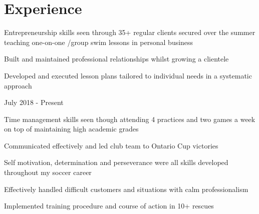 \documentclass[letterpaper]{deedy-resume} %
\begin{document}
\begin{minipage}[t]{0.66\textwidth}
\sectionspace




\section{Experience}


\begin{tightitemize}
\item Entrepreneurship skills seen through 35+ regular clients secured over the summer
teaching one-on-one /group swim lessons in personal business 
\item Built and maintained professional relationships whilst growing a clientele
\item Developed and executed lesson plans tailored to individual needs in a systematic approach 

\end{tightitemize}

\sectionspace %


July 2018 - Present 

\begin{tightitemize}

\item Time management skills seen though attending 4 practices and two games a week on top of maintaining high academic grades 
\item Communicated effectively and led club team to Ontario Cup victories 
\item Self motivation, determination and perseverance were all skills developed  throughout my soccer career

\end{tightitemize}

\sectionspace %

\begin{tightitemize}
\item Effectively handled difficult customers and situations with calm professionalism 
\item Implemented training procedure and course of action in 10+ rescues


\end{tightitemize}
\end{minipage}
\end{document}
